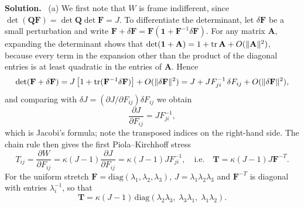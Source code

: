 \documentclass[a4paper,12pt]{paper}
\newenvironment{solution}{\par\noindent\textbf{Solution.}\ }{\par\medskip}
\begin{document}
\begin{solution}
(a) We first note that $W$ is frame indifferent, since
$\det(\mathbf{Q}\mathbf{F})=\det\mathbf{Q}\det\mathbf{F}=J$. To differentiate the determinant,
let $\delta\mathbf{F}$ be a small perturbation and write
$\mathbf{F}+\delta\mathbf{F}=\mathbf{F}(\mathbf{1}+\mathbf{F}^{-1}\delta\mathbf{F})$. For any
matrix $\mathbf{A}$, expanding the determinant shows that
$\det(\mathbf{1}+\mathbf{A})=1+\mathrm{tr}\,\mathbf{A}+O(\|\mathbf{A}\|^{2})$, because every term in
the expansion other than the product of the diagonal entries is at least quadratic in the
entries of $\mathbf{A}$. Hence
\begin{equation}
\det(\mathbf{F}+\delta\mathbf{F})=J\left[1+\mathrm{tr}(\mathbf{F}^{-1}\delta\mathbf{F})\right]+O(\|\delta\mathbf{F}\|^{2})
=J+JF^{-1}_{ji}\,\delta F_{ij}+O(\|\delta\mathbf{F}\|^{2}),
\label{eq:40}
\end{equation}
and comparing with $\delta J=(\partial J/\partial F_{ij})\delta F_{ij}$ we obtain
\begin{equation}
\frac{\partial J}{\partial F_{ij}}=JF^{-1}_{ji},
\label{eq:41}
\end{equation}
which is Jacobi's formula; note the transposed indices on the right-hand side. The chain rule
then gives the first Piola--Kirchhoff stress
\begin{equation}
T_{ij}=\frac{\partial W}{\partial F_{ij}}=\kappa(J-1)\frac{\partial J}{\partial F_{ij}}=\kappa(J-1)JF^{-1}_{ji},
\quad\mbox{i.e.}\quad\mathbf{T}=\kappa(J-1)J\mathbf{F}^{-T}.
\label{eq:42}
\end{equation}
For the uniform stretch $\mathbf{F}=\mathrm{diag}(\lambda_{1},\lambda_{2},\lambda_{3})$,
$J=\lambda_{1}\lambda_{2}\lambda_{3}$ and $\mathbf{F}^{-T}$ is diagonal with entries $\lambda_{i}^{-1}$,
so that
\begin{equation}
\mathbf{T}=\kappa(J-1)\,\mathrm{diag}(\lambda_{2}\lambda_{3},\;\lambda_{3}\lambda_{1},\;\lambda_{1}\lambda_{2}).
\label{eq:43}
\end{equation}


\end{solution}
\end{document}
